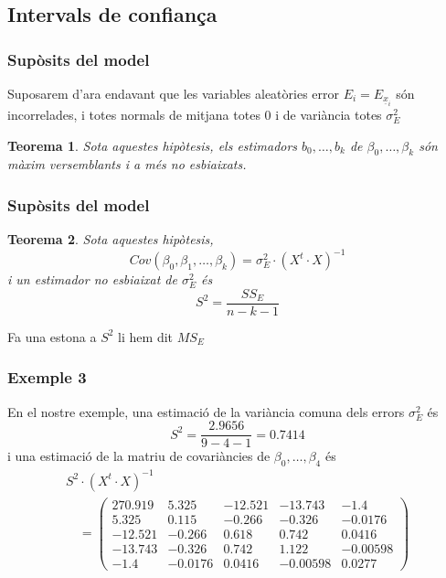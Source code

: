 \documentclass[12pt,t]{beamer}
\theoremstyle{plain}
\newtheorem{teorema}{Teorema}
\theoremstyle{definition}
\begin{document}
\subsection{Intervals de confiança}
\begin{frame}
\frametitle{Supòsits del model}

Suposarem d'ara endavant que les variables aleatòries error $E_i=E_{\underline{x}_{i}}$ són incorrelades, i totes normals de mitjana totes 0 i de variància totes $\sigma_E^2$
\medskip

\begin{teorema}
Sota aquestes hipòtesis, els estimadors $b_0,\ldots, b_k$ de
$\beta_0,\ldots,\beta_k$ són màxim versemblants i a més no esbiaixats.
\end{teorema}
\end{frame}

\begin{frame}
\frametitle{Supòsits del model}

\begin{teorema}
Sota aquestes hipòtesis, 
$$
Cov(\beta_0,\beta_1,\ldots,\beta_k)= \sigma_E^2\cdot (X^t\cdot X)^{-1}
$$
i un estimador no esbiaixat de $\sigma_E^2$ és
$$
S^2=\frac{SS_E}{n-k-1}
$$
\end{teorema}
Fa una estona a $S^2$ li hem dit $MS_E$

\end{frame}





\begin{frame}
\frametitle{Exemple 3}
En el nostre exemple, una estimació de la variància comuna dels errors $\sigma_E^2$ és
$$
S^2 = \frac{2.9656}{9-4-1}=0.7414
$$
i una estimació de la matriu de covariàncies de $\beta_0,\ldots, \beta_4$ és
{\footnotesize 
$$
\begin{array}{l}
S^2\cdot (X^t\cdot X)^{-1}\\[2ex]
\quad  =
\left(
\begin{array}{ccccc}
270.919 & 5.325 & -12.521 & -13.743 & -1.4 \\
5.325 & 0.115 & -0.266 & -0.326 & -0.0176 \\
-12.521 & -0.266 & 0.618 & 0.742 & 0.0416 \\
-13.743 & -0.326 & 0.742 & 1.122 & -0.00598 \\
-1.4 & -0.0176 & 0.0416 & -0.00598 & 0.0277
\end{array}
\right)
\end{array}
$$
}

\end{frame}
\end{document}
